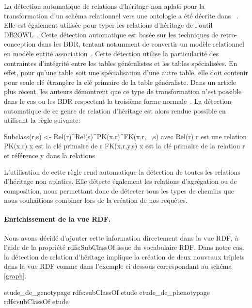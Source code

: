 La détection automatique de relations d'héritage non aplati pour la transformation d’un schéma relationnel vers une ontologie a été décrite dans~\cite{tirmizi_2008} . Elle est également utilisée pour typer les relations d'héritage de l’outil DB2OWL~\cite{Cullot2007}. Cette détection automatique est basée sur les techniques de retro-conception dans les BDR, tentant notamment de convertir un modèle relationnel en modèle entité association~\cite{Davis1987}. Cette détection utilise la particularité des contraintes d'intégrité entre les tables généralistes et les tables spécialisées. En effet, pour qu'une table soit une spécialisation d'une autre table, elle doit contenir pour seule clé étrangère la clé primaire de la table généraliste. Dans un article plus récent, les auteurs démontrent que ce type de transformation n’est possible dans le cas ou les BDR respectent la troisième forme normale~\cite{Sequeda2006}. La détection automatique de ce genre de relation d'héritage est alors rendue possible en utilisant la règle suivante:

\begin{verbatimtab}
Subclass(r,s) <- Rel(r)^Rel(s)^PK(x,r)^FK(x,r,_,s)
avec
Rel(r)	r est une relation
PK(x,r)	x est la clé primaire de r
FK(x,r,y,s) x est la clé primaire de la relation r 
	et référence y dans la relations
\end{verbatimtab}

L'utilisation de cette règle rend automatique la détection de toutes les relations d'héritage non aplaties. Elle détecte également les relations d'agrégation ou de composition, nous permettant donc de détecter tous les types de chemins que nous souhaitions combiner lors de la création de nos requêtes.

\paragraph*{Enrichissement de la vue RDF.}
Nous avons décidé d'ajouter cette information directement dans la vue RDF, à l'aide de la propriété rdfs:SubClassOf issue du vocabulaire RDF. Dans notre cas, la détection de relation d'héritage implique la création de deux nouveaux triplets dans la vue RDF comme dans l'exemple ci-dessous correspondant au schéma \ref{graph}. 

\begin{verbatimtab}
etude_de_genotypage 	rdfs:subClassOf 	etude
etude_de_phenotypage	rdfs:subClassOf 	etude
\end{verbatimtab}

